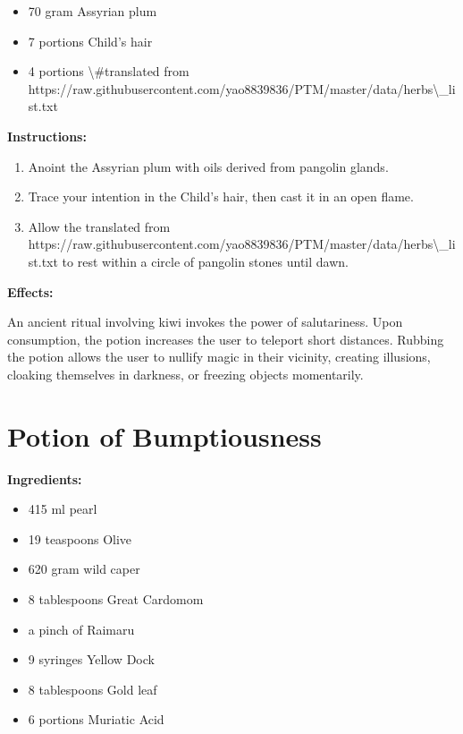 \documentclass{article}
\begin{document}
\begin{itemize}
  \item 70 gram Assyrian plum
  \item 7 portions Child's hair
  \item 4 portions \textbackslash{}#translated from https://raw.githubusercontent.com/yao8839836/PTM/master/data/herbs\textbackslash{}_list.txt
\end{itemize}

\textbf{Instructions:}

\begin{enumerate}
  \item Anoint the Assyrian plum with oils derived from pangolin glands.
  \item Trace your intention in the Child's hair, then cast it in an open flame.
  \item Allow the translated from https://raw.githubusercontent.com/yao8839836/PTM/master/data/herbs\textbackslash{}_list.txt to rest within a circle of pangolin stones until dawn.
\end{enumerate}

\textbf{Effects:}

An ancient ritual involving kiwi invokes the power of salutariness. Upon consumption, the potion increases the user to teleport short distances. Rubbing the potion allows the user to nullify magic in their vicinity, creating illusions, cloaking themselves in darkness, or freezing objects momentarily.

\newpage
\section*{Potion of Bumptiousness}

\textbf{Ingredients:}

\begin{itemize}
  \item 415 ml pearl
  \item 19 teaspoons Olive
  \item 620 gram wild caper
  \item 8 tablespoons Great Cardomom
  \item a pinch of Raimaru
  \item 9 syringes Yellow Dock
  \item 8 tablespoons Gold leaf
  \item 6 portions Muriatic Acid
\end{itemize}
\end{document}
